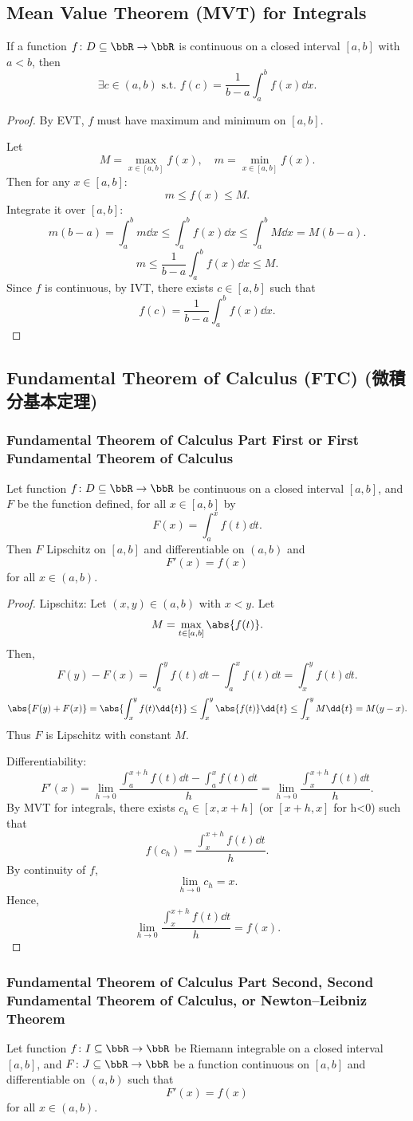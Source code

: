 \documentclass[a4paper,12pt]{report}
\begin{document}
\begin{itemize}
\begin{itemize}
\subsection{Mean Value Theorem (MVT) for Integrals}
If a function $f\colon D\subseteq\bbR\to\bbR$ is continuous on a closed interval $[a,b]$ with $a<b$, then
\[\exists c\in (a, b)\text{\ s.t.\ }f(c)=\frac{1}{b-a}\int_a^bf(x)\dd{x}.\]
\begin{proof}
By EVT, $f$ must have maximum and minimum on $[a,b]$.

Let
\[M=\max_{x\in [a,b]}f(x),\quad m=\min_{x\in [a,b]}f(x).\]
Then for any $x\in[a,b]$:
\[m\leq f(x)\leq M.\]
Integrate it over $[a,b]$:
\[m(b-a)=\int_a^bm\dd{x}\leq\int_a^bf(x)\dd{x}\leq\int_a^bM\dd{x}=M(b-a).\]
\[m\leq\frac{1}{b-a}\int_a^bf(x)\dd{x}\leq M.\]
Since $f$ is continuous, by IVT, there exists $c\in[a,b]$ such that
\[f(c)=\frac{1}{b-a}\int_a^bf(x)\dd{x}.\]
\end{proof}
\subsection{Fundamental Theorem of Calculus (FTC) (微積分基本定理)}
\subsubsection{Fundamental Theorem of Calculus Part First or First Fundamental Theorem of Calculus}
Let function $f\colon D\subseteq\bbR\to\bbR$ be continuous on a closed interval $[a,b]$, and $F$ be the function defined, for all $x\in[a,b]$ by
\[F(x)=\int_a^xf(t)\dd{t}.\]
Then $F$ Lipschitz on $[a,b]$ and differentiable on $(a,b)$ and
\[F'(x)=f(x)\]
for all $x\in (a,b)$.
\begin{proof}
Lipschitz: Let $(x,y)\in(a,b)$ with $x<y$. Let
\[M=\max_{t\in[a,b]}\abs{f(t)}.\]
Then,
\[F(y)-F(x)=\int_a^yf(t)\dd{t}-\int_a^xf(t)\dd{t}=\int_x^yf(t)\dd{t}.\]
\[\abs{F(y)+F(x)}=\abs{\int_x^yf(t)\dd{t}}\leq\int_x^y\abs{f(t)}\dd{t}\leq\int_x^yM\dd{t}=M(y-x).\]
Thus $F$ is Lipschitz with constant $M$.

Differentiability:
\[F'(x)=\lim_{h\to 0}\frac{\int_a^{x+h}f(t)\dd{t}-\int_a^xf(t)\dd{t}}{h}=\lim_{h\to 0}\frac{\int_x^{x+h}f(t)\dd{t}}{h}.\]
By MVT for integrals, there exists $c_h\in[x,x+h]$ (or $[x+h,x]$ for h<0) such that
\[f(c_h)=\frac{\int_x^{x+h}f(t)\dd{t}}{h}.\]
By continuity of $f$,
\[\lim_{h\to 0}c_h=x.\]
Hence,
\[\lim_{h\to 0}\frac{\int_x^{x+h}f(t)\dd{t}}{h}=f(x).\]
\end{proof}
\subsubsection{Fundamental Theorem of Calculus Part Second, Second Fundamental Theorem of Calculus, or Newton–Leibniz Theorem}
Let function $f\colon I\subseteq\bbR\to\bbR$ be Riemann integrable on a closed interval $[a,b]$, and $F\colon J\subseteq\bbR\to\bbR$ be a function continuous on $[a,b]$ and differentiable on $(a,b)$ such that
\[F'(x)=f(x)\]
for all $x\in (a,b)$.


\end{itemize}
\end{itemize}
\end{document}

